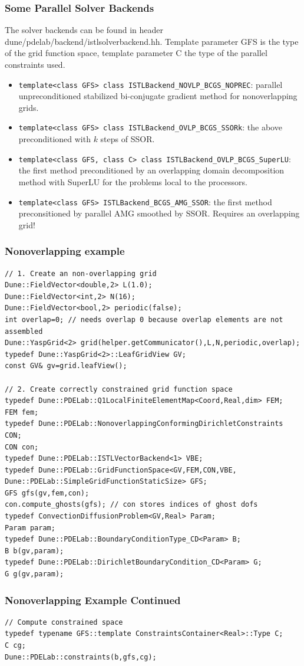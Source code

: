 {\begin{frame}
  \frametitle{Some Parallel Solver Backends}
  The solver backends can be found in header
  dune/pdelab/backend/istlsolverbackend.hh. Template parameter GFS is
  the type of the grid function space, template parameter C the type
  of the parallel constraints used.
  \begin{itemize}
  \item \lstinline!template<class GFS> class ISTLBackend_NOVLP_BCGS_NOPREC!:
    parallel unpreconditioned
    stabilized bi-conjugate gradient method for nonoverlapping grids.
    \item \lstinline!template<class GFS> class ISTLBackend_OVLP_BCGS_SSORk!:
      the above preconditioned with $k$ steps of SSOR.
    \item \lstinline!template<class GFS, class C> class ISTLBackend_OVLP_BCGS_SuperLU!:
      the first method preconditioned by an overlapping domain
      decomposition method with SuperLU for the problems local to the
      processors.
      \item \lstinline!template<class GFS> ISTLBackend_BCGS_AMG_SSOR!:
        the first method preconsitioned by parallel AMG smoothed by
        SSOR. Requires an overlapping grid!
  \end{itemize}
\end{frame}

\begin{frame}[fragile]
  \frametitle{Nonoverlapping example}
  \begin{lstlisting}[basicstyle=\tiny]
// 1. Create an non-overlapping grid
Dune::FieldVector<double,2> L(1.0);
Dune::FieldVector<int,2> N(16);
Dune::FieldVector<bool,2> periodic(false);
int overlap=0; // needs overlap 0 because overlap elements are not assembled
Dune::YaspGrid<2> grid(helper.getCommunicator(),L,N,periodic,overlap);
typedef Dune::YaspGrid<2>::LeafGridView GV;
const GV& gv=grid.leafView();

// 2. Create correctly constrained grid function space
typedef Dune::PDELab::Q1LocalFiniteElementMap<Coord,Real,dim> FEM;
FEM fem;
typedef Dune::PDELab::NonoverlappingConformingDirichletConstraints CON;
CON con;
typedef Dune::PDELab::ISTLVectorBackend<1> VBE;
typedef Dune::PDELab::GridFunctionSpace<GV,FEM,CON,VBE,
Dune::PDELab::SimpleGridFunctionStaticSize> GFS;
GFS gfs(gv,fem,con);
con.compute_ghosts(gfs); // con stores indices of ghost dofs
typedef ConvectionDiffusionProblem<GV,Real> Param;
Param param;
typedef Dune::PDELab::BoundaryConditionType_CD<Param> B;
B b(gv,param);
typedef Dune::PDELab::DirichletBoundaryCondition_CD<Param> G;
G g(gv,param);
\end{lstlisting}
\end{frame}
\begin{frame}[fragile]
\frametitle<presentation>{Nonoverlapping Example Continued}
  \begin{lstlisting}[basicstyle=\tiny]
// Compute constrained space
typedef typename GFS::template ConstraintsContainer<Real>::Type C;
C cg;
Dune::PDELab::constraints(b,gfs,cg);


\end{lstlisting}
\end{frame}}
